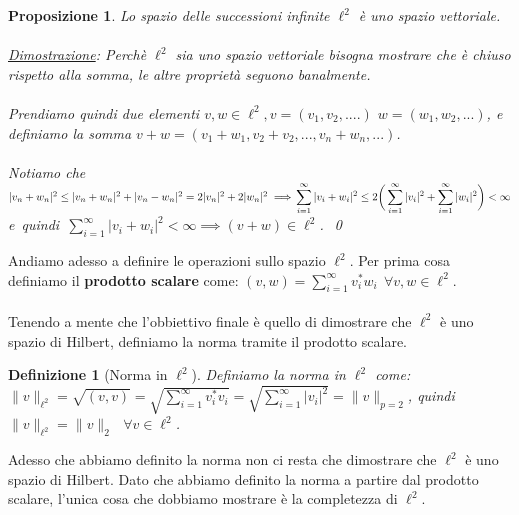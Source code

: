 \documentclass[a4paper,12pt]{report}
\newtheorem{definizione}{Definizione}[chapter]
\newtheorem{proposizione}{Proposizione}[chapter]
\newcommand{\lt}{<}
\begin{document}
\begin{proposizione}
    Lo spazio delle successioni infinite $\ell^2$ è uno spazio vettoriale.
    \\
    \\ \underline{Dimostrazione}: Perchè $\ell^2$ sia uno spazio vettoriale bisogna mostrare che è chiuso rispetto alla somma, le altre proprietà seguono banalmente.
    \\
    \\ Prendiamo quindi due elementi $v,w \in \ell^2, v=(v_1,v_2,....) $ $w=(w_1,w_2,...)$, e definiamo la somma $v+w=(v_1+w_1,v_2+v_2,...,v_n+w_n,...)$.
    \\
    \\ Notiamo che $|v_n+w_n|^2 \leq |v_n+w_n|^2+|v_n-w_n|^2=2|v_n|^2+2|w_n|^2\implies 
    \\
    \\\displaystyle \sum_{i=1}^\infty |v_i+w_i|^2\leq 2\bigg(\sum_{i=1}^\infty|v_i|^2+\sum_{i=1}^\infty|w_i|^2\bigg)\lt \infty$ \mbox{e quindi $\displaystyle\sum_{i=1}^\infty|v_i+w_i|^2\lt\infty \implies (v+w)\in \ell^2$. \qed}
\end{proposizione}

\newpage

Andiamo adesso a definire le operazioni sullo spazio $\ell^2$. Per prima cosa definiamo il \textbf{prodotto scalare} come:  $(v,w)=\displaystyle\sum_{i=1}^\infty v_i^*w_i \ \ \forall v,w\in \ell^2$.
\\
\\ Tenendo a mente che l'obbiettivo finale è quello di dimostrare che $\ell^2$ è uno spazio di Hilbert, definiamo la norma tramite il prodotto scalare.

\begin{definizione}[Norma in $\ell^2$]
    Definiamo la norma in $\ell^2$ come:
    \\$\|v\|_{\ell^2}=\sqrt{(v,v)}=\sqrt{\displaystyle\sum_{i=1}^\infty v_i^*v_i}=\sqrt{\displaystyle\sum_{i=1}^\infty|v_i|^2}=\|v\|_{p=2}$, quindi $\|v\|_{\ell^2}=\|v\|_2 \ \ \ \forall v\in \ell^2$.
\end{definizione}

Adesso che abbiamo definito la norma non ci resta che dimostrare che $\ell^2$ è uno spazio di Hilbert. Dato che abbiamo definito la norma a partire dal prodotto scalare, l'unica cosa che dobbiamo mostrare è la completezza di $\ell^2$.
\end{document}
